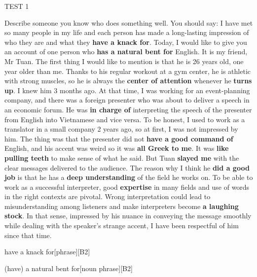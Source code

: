 \begin{glossarymc}[Cambridge 10]
\begin{test}{TEST 1}
\begin{qa}{Describe someone you know who does something well. You should say:}
    I have met so many people in my life and each person has made a long-lasting impression of who they are and what they \textbf{have a knack for}. Today, I would like to give you an account of one person who \textbf{has a natural bent for} English. It is my friend, Mr Tuan. The first thing I would like to mention is that he is 26 years old, one year older than me. Thanks to his regular workout at a gym center, he is athletic with strong muscles, so he is always the \textbf{center of attention} whenever he \textbf{turns up}. I knew him 3 months ago. At that time, I was working for an event-planning company, and there was a foreign presenter who was about to deliver a speech in an economic forum. He was \textbf{in charge of} interpreting the speech of the presenter from English into Vietnamese and vice versa. To be honest, I used to work as a translator in a small company 2 years ago, so at first, I was not impressed by him. The thing was that the presenter did not \textbf{have a good command of} English, and his accent was weird so it was \textbf{all Greek to me}. It was \textbf{like pulling teeth} to make sense of what he said. But Tuan \textbf{slayed me} with the clear messages delivered to the audience. The reason why I think he \textbf{did a good job} is that he has a \textbf{deep understanding} of the field he works on. To be able to work as a successful interpreter, good \textbf{expertise} in many fields and use of words in the right contexts are pivotal. Wrong interpretation could lead to misunderstanding among listeners and make interpreters become \textbf{a laughing stock}. In that sense, impressed by his nuance in conveying the message smoothly while dealing with the speaker's strange accent, I have been respectful of him since that time.
    \end{qa}

        \begin{VocabExplain}[Part 2]
            \begin{ExplainCard}{have a knack for}[phrase][B2]
            \end{ExplainCard}

            \begin{ExplainCard}{(have) a natural bent for}[noun phrase][B2]
            \end{ExplainCard}


\end{VocabExplain}
\end{test}
\end{glossarymc}
